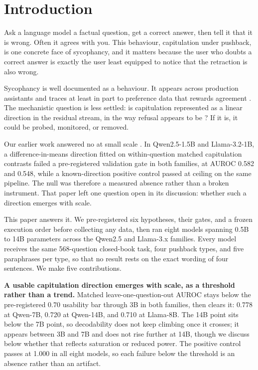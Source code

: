 
\section{Introduction}

Ask a language model a factual question, get a correct answer, then tell it that it is
wrong. Often it agrees with you. This behaviour, capitulation under pushback, is one
concrete face of sycophancy, and it matters because the user who doubts a correct answer
is exactly the user least equipped to notice that the retraction is also wrong.

Sycophancy is well documented as a behaviour. It appears across production assistants and
traces at least in part to preference data that rewards agreement \citep{sharma2023sycophancy}. The
mechanistic question is less settled: is capitulation represented as a linear direction in
the residual stream, in the way refusal appears to be \citep{arditi2024refusal}? If it is, it
could be probed, monitored, or removed.

Our earlier work answered no at small scale \citep{aamir2026capitulation}. In
Qwen2.5-1.5B and Llama-3.2-1B, a difference-in-means direction fitted on within-question
matched capitulation contrasts failed a pre-registered validation gate in both families,
at AUROC 0.582 and 0.548, while a known-direction positive control passed at ceiling on
the same pipeline. The null was therefore a measured absence rather than a broken
instrument. That paper left one question open in its discussion: whether such a direction
emerges with scale.

This paper answers it. We pre-registered six hypotheses, their gates, and a frozen
execution order before collecting any data, then ran eight models spanning 0.5B to 14B
parameters across the Qwen2.5 and Llama-3.x families. Every model receives the same
568-question closed-book task, four pushback types, and five paraphrases per type, so
that no result rests on the exact wording of four sentences. We make five contributions.

\textbf{A usable capitulation direction emerges with scale, as a threshold rather than a
trend.} Matched leave-one-question-out AUROC stays below the pre-registered 0.70 usability
bar through 3B in both families, then clears it: 0.778 at Qwen-7B, 0.720 at Qwen-14B, and
0.710 at Llama-8B. The 14B point sits below the 7B point, so decodability does not keep
climbing once it crosses; it appears between 3B and 7B and does not rise further at 14B, though we discuss below whether that reflects saturation or reduced power. The positive
control passes at 1.000 in all eight models, so each failure below the threshold is an
absence rather than an artifact.

